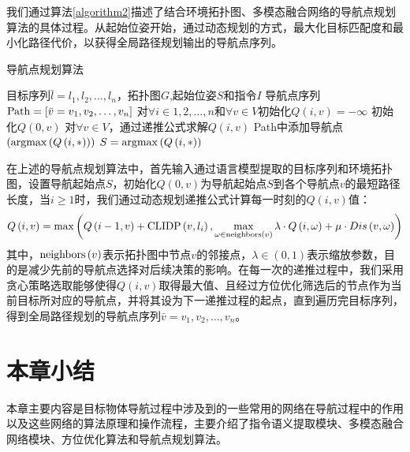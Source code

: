 我们通过算法\ref{algorithm2}描述了结合环境拓扑图、多模态融合网络的导航点规划算法的具体过程。从起始位姿开始，通过动态规划的方式，最大化目标匹配度和最小化路径代价，以获得全局路径规划输出的导航点序列。
\begin{algorithm}[!h]
    \caption{导航点规划算法}
    \label{algorithm2}
    \renewcommand{\algorithmicrequire}{\textbf{Input:}}
    \renewcommand{\algorithmicensure}{\textbf{Output:}}
    \renewcommand{\algorithmiccomment}[1]{\hfill $\triangleright$ #1}
    \begin{algorithmic}[1]
        \REQUIRE 目标序列$\bar l = {l_1},{l_2}, \ldots ,{l_n}$，拓扑图$G$,起始位姿$S$和指令$I$  %
        \ENSURE 导航点序列${\rm{Path}} = \left[ {\bar v = {v_1},{v_2}, \ldots ,{v_n}} \right]$   %
        \STATE  对$\forall i \in 1,2, \ldots ,n$和$\forall v \in V$初始化$Q\left( {i,v} \right) =  - \infty $
        \STATE  初始化$Q\left( {0,v} \right)$
            \STATE  对$\forall v \in V$，通过递推公式求解$Q\left( {i,v} \right)$
            \STATE  Path中添加导航点$\left( {{\rm{argmax}}\left( {Q\left( {i, * } \right)} \right)} \right)$
			\STATE  $S = {\rm{argmax}}\left( {Q\left( {i, * } \right)} \right)$
        \ENDFOR
    \end{algorithmic}
\end{algorithm}

在上述的导航点规划算法中，首先输入通过语言模型提取的目标序列和环境拓扑图，设置导航起始点$S$，初始化$Q\left( {0,v} \right)$为导航起始点$S$到各个导航点$v$的最短路径长度，当$i \ge 1$时，我们通过动态规划递推公式计算每一时刻的$Q(i, v)$值：
\begin{equation}
Q\left( {i,v} \right) = \max \left( {Q\left( {i - 1,v} \right) + {\rm{CLIDP}}\left( {v,{l_i}} \right),\mathop {\max }\limits_{\omega  \in {\rm{neighbors}}\left( v \right)} \lambda  \cdot Q\left( {i,\omega } \right) + \mu  \cdot Dis\left( {v,\omega } \right)} \right)
	\label{myeq16}
\end{equation}
其中，${{\rm{neighbors}}\left( v \right)}$表示拓扑图中节点$v$的邻接点，$\lambda  \in \left( {0,1} \right)$表示缩放参数，目的是减少先前的导航点选择对后续决策的影响。在每一次的递推过程中，我们采用贪心策略选取能够使得$Q\left( {i,v} \right)$取得最大值、且经过方位优化筛选后的节点作为当前目标所对应的导航点，并将其设为下一递推过程的起点，直到遍历完目标序列，得到全局路径规划的导航点序列$\bar v = {v_1},{v_2}, \ldots ,{v_n}$。




\section{本章小结}
本章主要内容是目标物体导航过程中涉及到的一些常用的网络在导航过程中的作用以及这些网络的算法原理和操作流程，主要介绍了指令语义提取模块、多模态融合网络模块、方位优化算法和导航点规划算法。




